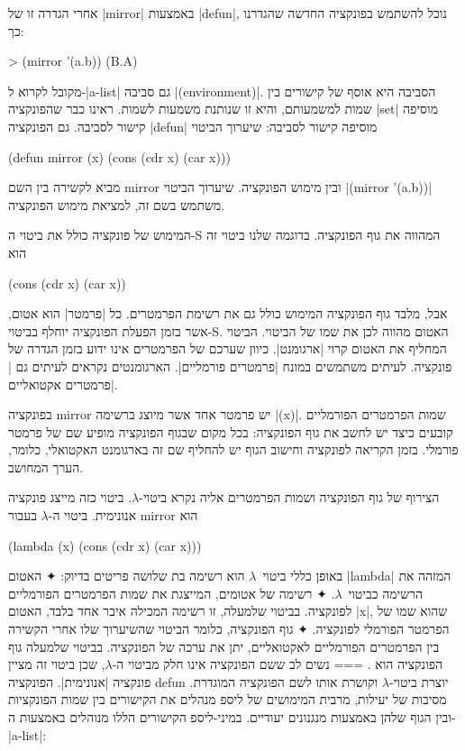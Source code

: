 אחרי הגדרה זו של \E|mirror| באמצעות \E|defun|, נוכל להשתמש בפונקציה החדשה
שהגדרנו כך:
\begin{LISP}
> (mirror '(a.b))
(B.A)
\end{LISP}

מקובל לקרוא ל-\E|a-list| גם סביבה \E|(environment)|. הסביבה היא אוסף של קישורים
בין שמות למשמעותם, והיא זו שנותנת משמעות לשמות. ראינו כבר שהפונקציה \E|set|
מוסיפה קישור לסביבה. גם הפונקציה \E|defun| מוסיפה קישור לסביבה: שיערוך הביטוי
\begin{LISP}
(defun mirror (x) (cons (cdr x) (car x)))
\end{LISP}
מביא לקשירה בין השם mirror ובין מימוש הפונקציה. שיערוך הביטוי \T|(mirror
'(a.b))| משתמש בשם זה, למציאת מימוש הפונקציה.

המימוש של פונקציה כולל את ביטוי ה-S המהווה את גוף הפונקציה. בדוגמה שלנו ביטוי
זה הוא
\begin{LISP}
(cons (cdr x) (car x))
\end{LISP}
אבל, מלבד גוף הפונקציה המימוש כולל גם את רשימת הפרמטרים. כל \ע|פרמטר|
הוא אטום, אשר בזמן הפעלת הפונקציה יוחלף בביטוי-S. האטום מהווה לכן את שמו של
הביטוי. הביטוי המחליף את האטום קרוי \ע|ארגומנט|. כיוון שערכם של הפרמטרים
אינו ידוע בזמן הגדרה של פונקציה. לעיתים משתמשים במונח \ע|פרמטרים פורמליים|.
הארגומנטים נקראים לעיתים גם \ע|פרמטרים אקטואליים|.

בפונקציה mirror יש פרמטר אחד אשר מיוצג ברשימה \T|(x)|. שמות הפרמטרים הפורמליים
קובעים כיצד יש לחשב את גוף הפונקציה: בכל מקום שבגוף הפונקציה מופיע שם של פרמטר
פורמלי. בזמן הקריאה לפונקציה וחישוב הגוף יש להחליף שם זה בארגומנט האקטואלי,
כלומר, הערך המחושב.

הצירוף של גוף הפונקציה ושמות הפרמטרים אליה נקרא ביטוי-$λ$. ביטוי כזה
מייצג פונקציה אנונימית. ביטוי ה-$λ$ בעבור mirror הוא
\begin{LISP}
  (lambda (x) (cons (cdr x) (car x)))
\end{LISP}

באופן כללי ביטוי~$λ$ הוא רשימה בת שלושה פריטים בדיוק:
✦ האטום \T|lambda| המזהה את הרשימה כביטוי~$λ$.
✦ רשימה של אטומים, המייצגת את שמות הפרמטרים הפורמליים לפונקציה. בביטוי שלמעלה,
זו רשימה המכילה איבר אחד בלבד, האטום \E|x|, שהוא שמו של הפרמטר הפורמלי
לפונקציה.
✦ גוף הפונקציה, כלומר הביטוי שהשיערוך שלו אחרי הקשירה בין הפרמטרים
הפורמליים לאקטואליים, יתן את ערכה של הפונקציה. בביטוי שלמעלה גוף הפונקציה הוא
.
===
נשים לב ששם הפונקציה אינו חלק מביטוי ה-$λ$, שכן ביטוי זה מציין פונקציה
\ע|אנונימית|. הפונקציה defun יוצרת ביטוי-$λ$ וקושרת אותו לשם הפונקציה המוגדרת.
מסיבות של יעילות, מרבית המימושים של ליספ מנהלים את הקישורים בין שמות הפונקציות
ובין הגוף שלהן באמצעות מנגנונים יעודיים. במיני-ליספ הקישורים הללו מנוהלים
באמצעות ה-\E|a-list|:

